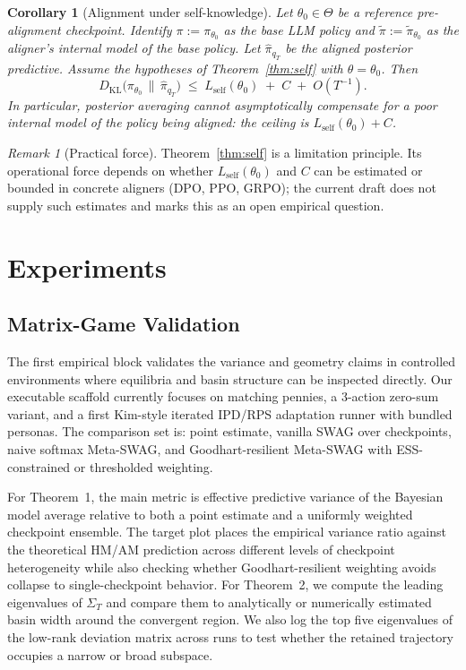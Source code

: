 \documentclass[10pt]{article}
\theoremstyle{plain}
\newtheorem{corollary}[theorem]{Corollary}
\theoremstyle{definition}
\theoremstyle{remark}
\newtheorem{remark}[theorem]{Remark}
\newcommand{\KL}{D_{\mathrm{KL}}}
\begin{document}
\begin{corollary}[Alignment under self-knowledge]\label{cor:self-align}
Let $\theta_0\in\Theta$ be a reference pre-alignment checkpoint. Identify $\pi := \pi_{\theta_0}$ as the base LLM policy and $\tilde\pi := \tilde\pi_{\theta_0}$ as the aligner's internal model of the base policy. Let $\hat\pi_{q_T}$ be the aligned posterior predictive. Assume the hypotheses of Theorem~\ref{thm:self} with $\theta = \theta_0$. Then
\[
\KL\!\bigl(\pi_{\theta_0} \,\big\|\, \hat\pi_{q_T}\bigr) \;\le\; L_{\mathrm{self}}(\theta_0) \;+\; C \;+\; O(T^{-1}).
\]
In particular, posterior averaging cannot asymptotically compensate for a poor internal model of the policy being aligned: the ceiling is $L_{\mathrm{self}}(\theta_0)+C$.
\end{corollary}

\begin{remark}[Practical force]
Theorem~\ref{thm:self} is a limitation principle. Its operational force depends on whether $L_{\mathrm{self}}(\theta_0)$ and $C$ can be estimated or bounded in concrete aligners (DPO, PPO, GRPO); the current draft does not supply such estimates and marks this as an open empirical question.
\end{remark}

\section{Experiments}

\subsection{Matrix-Game Validation}

The first empirical block validates the variance and geometry claims in controlled environments where equilibria and basin structure can be inspected directly. Our executable scaffold currently focuses on matching pennies, a 3-action zero-sum variant, and a first Kim-style iterated IPD/RPS adaptation runner with bundled personas. The comparison set is: point estimate, vanilla SWAG over checkpoints, naive softmax Meta-SWAG, and Goodhart-resilient Meta-SWAG with ESS-constrained or thresholded weighting.

For Theorem~1, the main metric is effective predictive variance of the Bayesian model average relative to both a point estimate and a uniformly weighted checkpoint ensemble. The target plot places the empirical variance ratio against the theoretical HM/AM prediction across different levels of checkpoint heterogeneity while also checking whether Goodhart-resilient weighting avoids collapse to single-checkpoint behavior. For Theorem~2, we compute the leading eigenvalues of $\Sigma_T$ and compare them to analytically or numerically estimated basin width around the convergent region. We also log the top five eigenvalues of the low-rank deviation matrix across runs to test whether the retained trajectory occupies a narrow or broad subspace.
\end{document}
